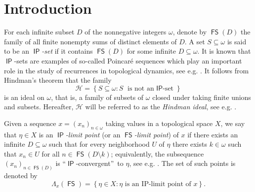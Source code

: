 \documentclass{amsart}
\theoremstyle{plain}
\theoremstyle{definition}
\theoremstyle{remark}
\DeclareMathOperator{\FS}{\mathsf{FS}}
\DeclareMathOperator{\IP}{\mathsf{IP}}
\begin{document}

\maketitle




\section{Introduction}\label{sec:intro}

For each infinite subset $D$ of the nonnegative integers $\omega$, denote by $\FS(D)$ the family of all finite nonempty sums of distinct elements of $D$.  
A set $S\subseteq \omega$ is said to be an \emph{$\IP$-set} if it contains $\FS(D)$ for some infinite $D\subseteq\omega$. 
It is known that $\IP$-sets are examples of so-called Poincar\'{e} sequences which play an important role in the study of recurrences in topological dynamics, see e.g. \cite[p. 74]{MR0603625}. 
It follows from Hindman's theorem \cite{MR0349574} that the family
\begin{equation}\label{eq:defiH}
\mathcal{H}=\left\{S\subseteq \omega: S\text{ is not an $\IP$-set}\right\}
\end{equation}
is an ideal on $\omega$, that is, a family of subsets of $\omega$ closed under taking finite unions and subsets. Hereafter, $\mathcal{H}$ will be referred to as the \emph{Hindman ideal}, see e.g. \cite[p. 109]{MR2471564}. 

Given a sequence $x=(x_n)_{n \in \omega}$ taking values in a topological space $X$, we say that $\eta \in X$ is an \emph{$\IP$-limit point} (or an $\FS$\emph{-limit point}) 
of $x$ if there exists an infinite $D\subseteq \omega$ such that for every neighborhood $U$ of $\eta$ there exists $k \in \omega$ such that $x_n \in U$ for all $n \in \FS(D\setminus k)$; equivalently, the subsequence $(x_n)_{n \in \FS(D)}$ is \textquotedblleft $\IP$-convergent\textquotedblright\, to $\eta$, see e.g. \cite{MR0531271}. The set of such points is denoted by 
\begin{equation*}
    \Lambda_{x}(\FS)=\left\{\eta \in X: \eta \text{ is an }\mathrm{IP}\text{-limit point of }x\right\}.
\end{equation*}
\end{document}
